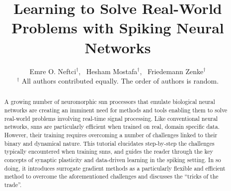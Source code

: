 \documentclass[journal,onecolumn,11pt]{IEEEtran}
\begin{document}
\title{Learning to Solve Real-World Problems with Spiking Neural Networks}

\author{Emre O. Neftci$^\dagger$,~
        Hesham Mostafa$^\dagger$,~
        Friedemann Zenke$^\dagger$\\
        {\small $^\dagger$ All authors contributed equally. The order of authors is random.}}%
%
{}
%
\maketitle
\IEEEpeerreviewmaketitle
%
\begin{abstract}
A growing number of neuromorphic \gls{snn} processors that emulate biological neural networks are creating an imminent need for methods and tools enabling them to solve real-world problems involving real-time signal processing.
Like conventional neural networks, \glspl{snn} are particularly efficient when trained on real, domain specific data. 
However, their training requires overcoming a number of challenges linked to their binary and dynamical nature.
This tutorial elucidates step-by-step the challenges typically encountered when training \glspl{snn}, and guides the reader through the key concepts of synaptic plasticity and data-driven learning in the spiking setting.
In so doing, it introduces surrogate gradient methods as a particularly flexible and efficient method to overcome the aforementioned challenges and discusses the ``tricks of the trade''. 
\end{abstract}
\end{document}
